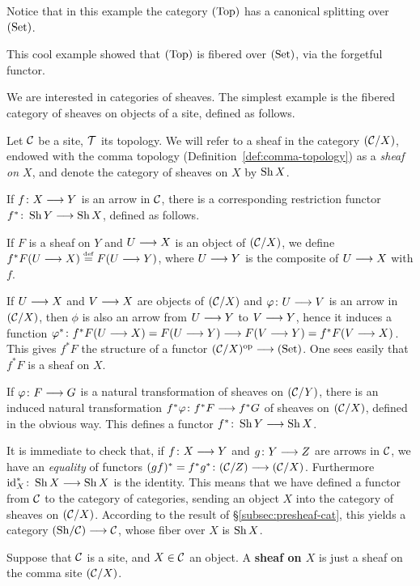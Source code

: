 \begin{3   FIBERED CATEGORIES}
\begin{3.2 Examples of fibered categories}
\begin{example}
Notice that in this example the category $(\mathrm{Top})$ has a canonical splitting over $(\mathrm{Set})$.
\begin{shaded}
This cool example showed that $(\mathrm{Top})$ is fibered over $(\mathrm{Set})$, via the forgetful functor.
\end{shaded}

\end{example}

We are interested in categories of sheaves. The simplest example is the fibered category of sheaves on objects of a site, defined as follows.



\begin{example}\label{ex:fibered-sheaves}
Let $\mathcal{C}$ be a site, $\mathcal{T}$ its topology. We will refer to a sheaf in the category $(\mathcal{C}/X)$, endowed with the comma topology (Definition~\ref{def:comma-topology}) as a \emph{sheaf on $X$}, and denote the category of sheaves on $X$ by $\operatorname{Sh}{X}$.


If $f \colon X \arr Y$ is an arrow in $\mathcal{C}$, there is a corresponding restriction functor $f^* \colon \sh{Y} \arr \sh{X}$, defined as follows.

If $F$ is a sheaf on $Y$ and $U \arr X$ is an object of $(\mathcal{C}/X)$, we define $f^*F(U \arr X) \eqdef F(U \arr Y)$, where $U \arr Y$ is the composite of $U \arr X$ with $f$.

If $U \arr X$ and $V \arr X$ are objects of $(\mathcal{C}/X)$ and $\phi \colon U \arr V$ is an arrow in $(\mathcal{C}/X)$, then $\phi$ is also an arrow from $U \arr Y$ to $V \arr Y$, hence it induces a function $\phi^* \colon f^*F(U \arr X) = F(U \arr Y) \arr F(V \arr Y) = f^*F(V \arr X)$. This gives $f^*F$ the structure of a functor $(\cC/X)\op \arr \catset$. One sees easily that $f^*F$ is a sheaf on $X$.

If $\phi \colon F \arr G$ is a natural transformation of sheaves on $(\mathcal{C}/Y)$, there is an induced natural transformation $f^*\phi \colon f^*F \arr f^*G$ of sheaves on $(\mathcal{C}/X)$, defined in the obvious way. This defines a functor $f^* \colon \sh Y \arr \sh X$.

It is immediate to check that, if $f \colon X \arr Y$ and $g \colon Y \arr Z$ are arrows in $\mathcal{C}$, we have an \emph{equality} of functors $(gf)^* = f^*g^* \colon (\cC/Z) \arr (\cC/X)$. Furthermore $\id_X^* \colon \sh X \arr \sh X$ is the identity. This means that we have defined a functor from $\mathcal{C}$ to the category of categories, sending an object $X$ into the category of sheaves on $(\mathcal{C}/X)$. According to the result of \S\ref{subsec:presheaf-cat}, this yields a category $\catsh{\cC} \arr \cC$, whose fiber over $X$ is $\operatorname{Sh}{X}$.
\begin{shaded}
Suppose that $\mathcal{C}$ is a site, and $X\in\mathcal{C}$ an object. A \textbf{sheaf on $X$} is just a sheaf on the comma site $(\mathcal{C}/X)$.
\end{shaded}


\end{example}
\end{3.2 Examples of fibered categories}
\end{3   FIBERED CATEGORIES}
